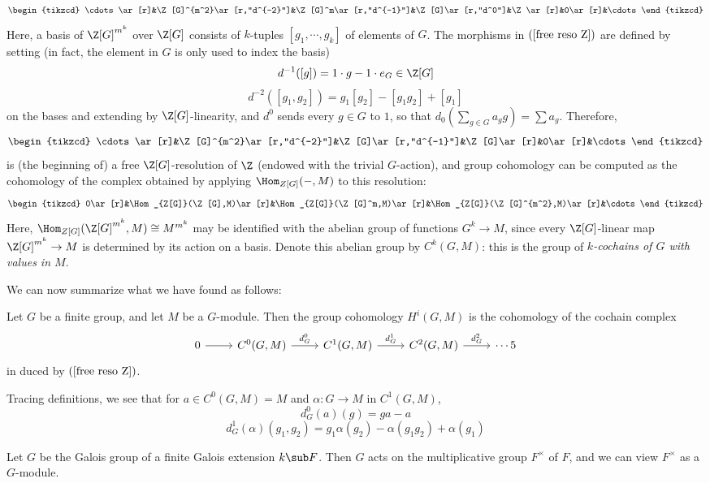 \begin{equation}\label{free reso Z}
\begin{tikzcd}
\cdots\ar[r]&\Z[G]^{m^2}\ar[r,"d^{-2}"]&\Z[G]^m\ar[r,"d^{-1}"]&\Z[G]\ar[r,"d^0"]&\Z\ar[r]&0\ar[r]&\cdots
\end{tikzcd}
\end{equation}
Here, a basis of $\Z[G]^{m^k}$ over $\Z[G]$ consists of $k$-tuples $[g_1,\cdots,g_k]$ of elements of $G$. The morphisms in $(\ref{free reso Z})$ are defined by setting (in fact, the element in $G$ is only used to index the basis)
\[d^{-1}([g])=1\cdot g-1\cdot e_G\in\Z[G]\]
\[d^{-2}([g_1,g_2])=g_1[g_2]-[g_1g_2]+[g_1]\]
on the bases and extending by $\Z[G]$-linearity, and $d^0$ sends every $g\in G$ to $1$, so that $d_0(\sum_{g\in G}a_gg)=\sum a_g$. Therefore,
\[\begin{tikzcd}
\cdots\ar[r]&\Z[G]^{m^2}\ar[r,"d^{-2}"]&\Z[G]\ar[r,"d^{-1}"]&\Z[G]\ar[r]&0\ar[r]&\cdots
\end{tikzcd}\]
is (the beginning of) a free $\Z[G]$-resolution of $\Z$ (endowed with the trivial $G$-action), and group cohomology can be computed as the cohomology of the complex obtained by applying $\Hom_{Z[G]}(-,M)$ to this resolution:
\[\begin{tikzcd}
0\ar[r]&\Hom_{Z[G]}(\Z[G],M)\ar[r]&\Hom_{Z[G]}(\Z[G]^m,M)\ar[r]&\Hom_{Z[G]}(\Z[G]^{m^2},M)\ar[r]&\cdots
\end{tikzcd}\]
Here, $\Hom_{Z[G]}(\Z[G]^{m^k},M)\cong M^{m^k}$ may be identified with the abelian group of
functions $G^k\to M$, since every $\Z[G]$-linear map $\Z[G]^{m^k}\to M$ is determined by its action on a basis. Denote this abelian group by $C^k(G,M)$: this is the group of \textit{$k$-cochains of $G$ with values in $M$}.\par
We can now summarize what we have found as follows:
\begin{proposition}
Let $G$ be a finite group, and let $M$ be a $G$-module. Then the group cohomology $H^i(G,M)$ is the cohomology of the cochain complex
\[\begin{tikzcd}
0\ar[r]&C^0(G,M)\ar[r,"d_G^0"]&C^1(G,M)\ar[r,"d_G^1"]&C^2(G,M)\ar[r,"d_G^2"]&\cdots5
\end{tikzcd}\]
in duced by $(\ref{free reso Z})$.
\end{proposition}
Tracing definitions, we see that for $a\in C^0(G,M)=M$ and $\alpha:G\to M$ in $C^1(G,M)$,
\[d_G^0(a)(g)=ga-a\]
\[d_G^1(\alpha)(g_1,g_2)=g_1\alpha(g_2)-\alpha(g_1g_2)+\alpha(g_1)\]
\begin{example}
Let $G$ be the Galois group of a finite Galois extension $k\sub F$. Then $G$ acts on the multiplicative group $F^{\times}$ of $F$, and we can view $F^{\times}$ as a $G$-module.
\end{example}
